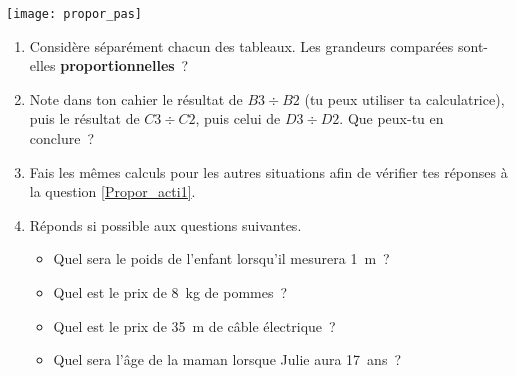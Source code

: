 \begin{activite}

\begin{center} \texttt{[image: propor\_pas]} \end{center}

\begin{enumerate}
 \item Considère séparément chacun des tableaux. Les grandeurs comparées sont-elles \textbf{proportionnelles} ? \label{Propor_acti1}
 \item Note dans ton cahier le résultat de $B3 \div B2$ (tu peux utiliser ta calculatrice), puis le résultat de $C3 \div C2$, puis celui de $D3 \div D2$. Que peux-tu en conclure ?
 \item Fais les mêmes calculs pour les autres situations afin de vérifier tes réponses à la question \ref{Propor_acti1}.
 \item Réponds si possible aux questions suivantes.
 \begin{itemize}
  \item Quel sera le poids de l'enfant lorsqu'il mesurera 1 m ?
  \item Quel est le prix de 8 kg de pommes ?
  \item Quel est le prix de 35 m de câble électrique ?
  \item Quel sera l'âge de la maman lorsque Julie aura 17 ans ?
  \end{itemize}
 \end{enumerate}
 
\end{activite}


